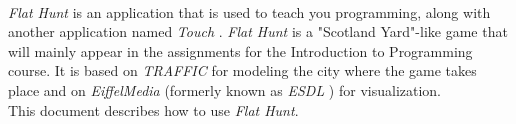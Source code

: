   \paragraph{}
  \emph{Flat Hunt} is an application that is used to teach you programming, along with another application named \emph{Touch} \cite{ugrk05}. \emph{Flat Hunt} is a "Scotland Yard"-like game that will mainly appear in the assignments for the Introduction to Programming course. It is based on \emph{TRAFFIC} \cite{ugsa05} for modeling the city where the game takes place and on \emph{EiffelMedia} (formerly known as \emph{ESDL} \cite{ugtgb03}) for visualization.\\

\noindent This document describes how to use \emph{Flat Hunt}.

  \pagebreak

